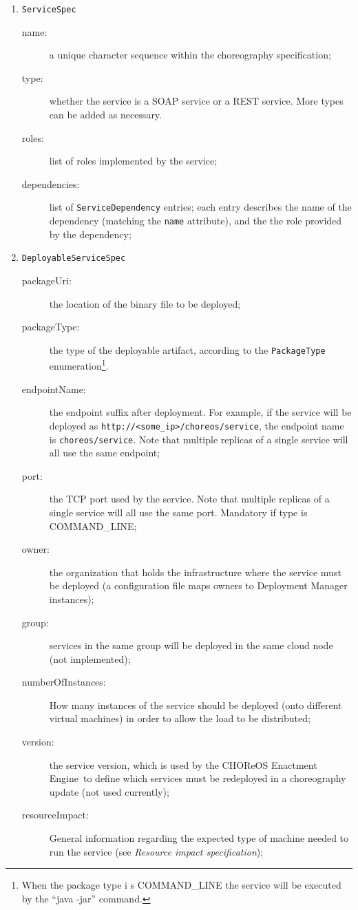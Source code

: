 \documentclass[a4paper, 10pt]{article}
\newcommand{\ee}{CHOReOS Enactment Engine}
\begin{document}
\begin{enumerate}

\item \verb!ServiceSpec!
	\begin{description}
		\item [name:] a unique character sequence within the choreography specification;
		\item [type:] whether the service is a SOAP service or a REST service. More types can be added as necessary.
		\item [roles:] list of roles implemented by the service;
		\item [dependencies:] list of \verb!ServiceDependency! entries; each entry describes the name of the dependency (matching the \verb!name! attribute), and the the role provided by the dependency;
	\end{description}

\item \verb!DeployableServiceSpec!
	\begin{description}
		\item [packageUri:] the location of the binary file to be deployed;
		\item [packageType:] the type of the deployable artifact, according to the \verb!PackageType! enumeration\footnote{When the package type i    s COMMAND\_LINE the service will be executed by the ``java -jar'' command.}.
		\item [endpointName:] the endpoint suffix after deployment. For example, if the service will be deployed as \verb!http://<some_ip>/choreos/service!, the endpoint name is \verb!choreos/service!. Note that multiple replicas of a single service will all use the same endpoint;
		\item [port:] the TCP port used by the service. Note that multiple replicas of a single service will all use the same port. Mandatory if type is COMMAND\_LINE;
		\item [owner:] the organization that holds the infrastructure where the service must be deployed (a configuration file maps owners to Deployment Manager instances);
		\item [group:] services in the same group will be deployed in the same cloud node (not implemented);
		\item [numberOfInstances:] How many instances of the service should be deployed (onto different virtual machines) in order to allow the load to be distributed;
		\item [version:] the service version, which is used by the \ee\ to define which services must be redeployed in a choreography update (not used currently);
		\item [resourceImpact:] General information regarding the expected type of machine needed to run the service (see \emph{Resource impact specification});
	\end{description}


\end{enumerate}
\end{document}
